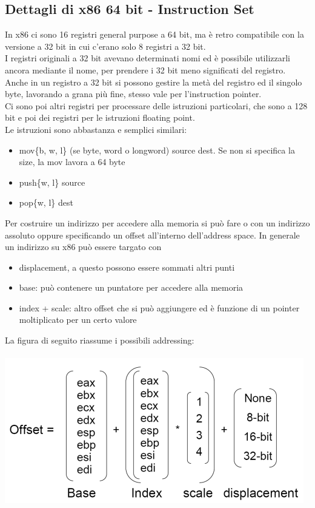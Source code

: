 \documentclass[12pt, oneside]{extbook}
\begin{document}
\subsection{Dettagli di x86 64 bit - Instruction Set}
In x86 ci sono 16 registri general purpose a 64 bit, ma è retro compatibile con la versione a 32 bit in cui c'erano solo 8 registri a 32 bit.\\ I registri originali a 32 bit avevano determinati nomi ed è possibile utilizzarli ancora mediante il nome, per prendere i 32 bit meno significati del registro. Anche in un registro a 32 bit si possono gestire la metà del registro ed il singolo byte, lavorando a grana più fine, stesso vale per l'instruction pointer.\\ Ci sono poi altri registri per processare delle istruzioni particolari, che sono a 128 bit e poi dei registri per le istruzioni floating point.\\ Le istruzioni sono abbastanza e semplici similari:
\begin{itemize}
\item \textsf{mov\{b, w, l\}} (se byte, word o longword) \textsf{source dest}. Se non si specifica la size, la mov lavora a 64 byte
\item \textsf{push\{w, l\} source}
\item \textsf{pop\{w, l\} dest}
\end{itemize}
Per costruire un indirizzo per accedere alla memoria si può fare o con un indirizzo assoluto oppure specificando un offset all'interno dell'address space. In generale un indirizzo su x86 può essere targato con
\begin{itemize}
\item displacement, a questo possono essere sommati altri punti
\item base: può contenere un puntatore per accedere alla memoria
\item index + scale: altro offset che si può aggiungere ed è funzione di un pointer moltiplicato per un certo valore 
\end{itemize}
La figura di seguito riassume i possibili addressing:\\\\
\includegraphics[scale=0.6]{immagini/address_offset}\\\\
\end{document}
